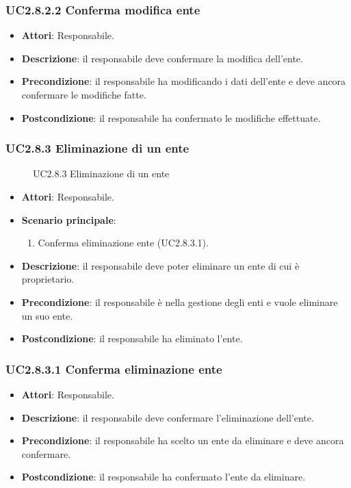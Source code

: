 \subsubsection{UC2.8.2.2 Conferma modifica ente}
\begin{itemize}
\item \textbf{Attori}: Responsabile.
\item \textbf{Descrizione}: il responsabile deve confermare la modifica dell'ente.
\item \textbf{Precondizione}: il responsabile ha modificando i dati dell'ente e deve ancora confermare le modifiche fatte.
\item \textbf{Postcondizione}: il responsabile ha confermato le modifiche effettuate.
\end{itemize}
\subsubsection{UC2.8.3 Eliminazione di un ente}
\begin{figure}[H]
\centering
\noindent{}
\caption{UC2.8.3 Eliminazione di un ente}
\end{figure}
\begin{itemize}
\item \textbf{Attori}: Responsabile.
\item \textbf{Scenario principale}:
\begin{enumerate}
\item Conferma eliminazione ente (UC2.8.3.1).
\end{enumerate}
\item \textbf{Descrizione}: il responsabile deve poter eliminare un ente di cui è proprietario.
\item \textbf{Precondizione}: il responsabile è nella gestione degli enti e vuole eliminare un suo ente.
\item \textbf{Postcondizione}: il responsabile ha eliminato l'ente.
\end{itemize}
\subsubsection{UC2.8.3.1 Conferma eliminazione ente}
\begin{itemize}
\item \textbf{Attori}: Responsabile.
\item \textbf{Descrizione}: il responsabile deve confermare l'eliminazione dell'ente.
\item \textbf{Precondizione}: il responsabile ha scelto un ente da eliminare e deve ancora confermare.
\item \textbf{Postcondizione}: il responsabile ha confermato l'ente da eliminare.
\end{itemize}
